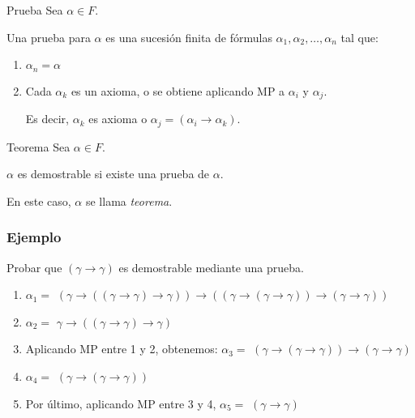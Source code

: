 \medskip

\begin{definicion}{Prueba}{}
    Sea $\alpha \in F$.

    \medskip

    Una prueba para $\alpha$ es una sucesión finita de fórmulas
    $\alpha_1, \alpha_2, \dotsc, \alpha_n$ tal que:
    \begin{enumerate}
        \item $\alpha_n = \alpha$
        \item Cada $\alpha_k$ es un axioma, o se obtiene aplicando MP a 
            $\alpha_i$ y $\alpha_j$.

            Es decir, $\alpha_k$ es axioma o $\alpha_j = (\alpha_i \to \alpha_k)$.

    \end{enumerate}
\end{definicion}

\medskip

\begin{definicion}{Teorema}{}
    Sea $\alpha \in F$.

    \medskip

    $\alpha$ es demostrable si existe una prueba de $\alpha$.

    \bigskip
    En este caso, $\alpha$ se llama \textit{teorema}.
\end{definicion}

\subsubsection{Ejemplo}

Probar que $(\gamma \to \gamma)$ es demostrable mediante una prueba.

\begin{enumerate}
    \item $\alpha_1=$ $(\gamma \to ((\gamma \to \gamma) \to \gamma )) 
        \to 
        ((\gamma \to (\gamma \to \gamma))\to (\gamma \to \gamma))$

    \item $\alpha_2=$ $\gamma \to ( (\gamma \to \gamma) \to \gamma)$

    \item Aplicando MP entre 1 y 2, obtenemos:
        $\alpha_3=$ $(\gamma \to (\gamma \to \gamma)) \to (\gamma \to \gamma)$

    \item $\alpha_4=$ $(\gamma \to (\gamma \to \gamma))$

    \item Por último, aplicando MP entre 3 y 4, 
        $\alpha_5=$ $(\gamma \to \gamma)$
\end{enumerate}

